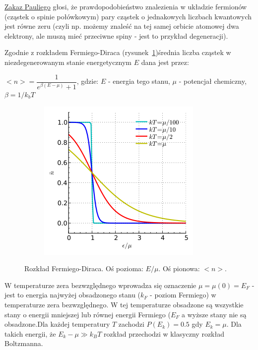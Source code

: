 \underline{Zakaz Pauliego} głosi, że prawdopodobieństwo znalezienia w układzie fermionów (cząstek o spinie połówkowym) pary cząstek o jednakowych liczbach kwantowych jest równe zeru (czyli np. możemy znaleść na tej samej orbicie atomowej dwa elektrony, ale muszą mieć przeciwne spiny - jest to przykład degeneracji).

Zgodnie z rozkładem Fermiego-Diraca (rysunek~\ref{fermi})średnia liczba cząstek w niezdegenerowanym stanie energetycznym $ E $ dana jest przez:\newline

$ <n> = \dfrac{1}{e^{\beta (E-\mu)}+1} $, gdzie:\newline
$ E $ - energia tego stanu,\newline
$ \mu $ - potencjał chemiczny,\newline
$ \beta = 1/k_bT $\newline

\begin{figure} [H]
	\centering
	\begin{subfigure}{1.0\textwidth}
		\centering
		\includegraphics[width=0.7\linewidth]{generalIssues/Figures/fermi.png}
	\end{subfigure}
	\caption{Rozkład Fermiego-Diraca. Oś pozioma: $ E/\mu $. Oś pionowa: $ <n> $.}
	\label{fermi}
\end{figure}

W temperaturze zera bezwzględnego wprowadza się oznaczenie $ \mu = \mu(0) = E_F $ - jest to energia najwyżej obsadzonego stanu ($ k_F $ - poziom Fermiego) w temperaturze zera bezwzględnego. W tej temperaturze obsadzone są wszystkie stany o energii mniejszej lub równej energii Fermiego ($ E_F $ a wyższe stany nie są obsadzone.Dla każdej temperatury $ T $ zachodzi $ P(E_k) = 0.5 $ gdy $ E_k = \mu $. Dla takich energii, że $ E_k - \mu \gg k_BT $ rozkład przechodzi w klasyczny rozkład Boltzmanna.

